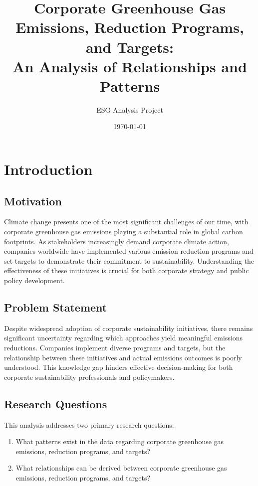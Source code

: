 \documentclass[11pt,a4paper]{article}
\title{Corporate Greenhouse Gas Emissions, Reduction Programs, and Targets: \\
An Analysis of Relationships and Patterns}
\author{ESG Analysis Project}
\date{\today}
\begin{document}
\maketitle
\tableofcontents
\clearpage

\section{Introduction}
\subsection{Motivation}
Climate change presents one of the most significant challenges of our time, with corporate greenhouse gas emissions playing a substantial role in global carbon footprints. As stakeholders increasingly demand corporate climate action, companies worldwide have implemented various emission reduction programs and set targets to demonstrate their commitment to sustainability. Understanding the effectiveness of these initiatives is crucial for both corporate strategy and public policy development.

\subsection{Problem Statement}
Despite widespread adoption of corporate sustainability initiatives, there remains significant uncertainty regarding which approaches yield meaningful emissions reductions. Companies implement diverse programs and targets, but the relationship between these initiatives and actual emissions outcomes is poorly understood. This knowledge gap hinders effective decision-making for both corporate sustainability professionals and policymakers.

\subsection{Research Questions}
This analysis addresses two primary research questions:
\begin{enumerate}
    \item What patterns exist in the data regarding corporate greenhouse gas emissions, reduction programs, and targets?
    \item What relationships can be derived between corporate greenhouse gas emissions, reduction programs, and targets?
\end{enumerate}
\end{document}
